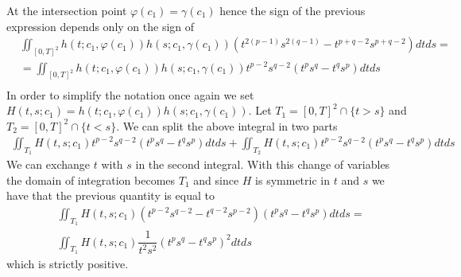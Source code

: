 \documentclass[corpo=11pt, stile=classica, tipotesi=custom,
greek, evenboxes, english]{toptesi}
\numberwithin{equation}{chapter}
\begin{document}
At the intersection point $\varphi(c_1)=\gamma(c_1)$ hence the sign of the previous expression depends only on the sign of
\begin{equation*}
	\begin{split}
		&\iint_{[0,T]^2} h(t;c_1,\varphi(c_1)) h(s;c_1,\gamma(c_1))\left( t^{2(p-1)} s^{2(q-1)} - t^{p+q-2} s^{p+q-2} \right)dtds=\\
		&=\iint_{[0,T]^2} h(t;c_1,\varphi(c_1)) h(s;c_1,\gamma(c_1)) t^{p-2}s^{q-2}\left( t^p s^q - t^q s^p \right)dtds\\
	\end{split}
\end{equation*}
In order to simplify the notation once again we set $H(t,s;c_1) = h(t;c_1,\varphi(c_1)) h(s;c_1,\gamma(c_1))$. Let $T_1 = [0,T]^2 \cap \{t>s\}$ and $T_2 = [0,T]^2 \cap \{t<s\}$. We can split the above integral in two parts
\begin{equation*}
	\begin{split}
		\iint_{T_1} H(t,s;c_1)t^{p-2}s^{q-2}\left( t^p s^q - t^q s^p \right)dtds + \iint_{T_2} H(t,s;c_1)t^{p-2}s^{q-2}\left( t^p s^q - t^q s^p \right)dtds
	\end{split}
\end{equation*}
We can exchange $t$ with $s$ in the second integral. With this change of variables the domain of integration becomes $T_1$ and since $H$ is symmetric in $t$ and $s$ we have that the previous quantity is equal to
\begin{equation*}
	\begin{split}
		&\iint_{T_1} H(t,s;c_1)\left( t^{p-2} s^{q-2} - t^{q-2} s^{p-2} \right) \left( t^p s^q - t^q s^p \right)dtds =\\
		&\iint_{T_1} H(t,s;c_1)\dfrac{1}{t^2 s^2}\left( t^p s^q - t^q s^p \right)^2 dtds
	\end{split}
\end{equation*}
which is strictly positive.
\end{document}
